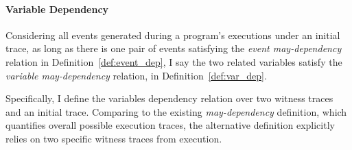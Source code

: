 \paragraph*{Variable Dependency}
{Considering 
all events generated during a program's executions
under an initial trace,
as long as there is one pair of events satisfying the \emph{event may-dependency} relation in Definition~\ref{def:event_dep}, 
 I say the two 
related
variables satisfy the \emph{variable may-dependency} relation, in Definition~\ref{def:var_dep}.
}
\begin{defn}
    \label{def:var_dep}
    \end{defn}
    Specifically, I define the variables dependency relation over two witness traces and an initial trace. Comparing to 
    the existing \emph{may-dependency} definition, which quantifies overall possible execution traces, the alternative
    definition explicitly relies on two specific witness traces from execution.
    \\

